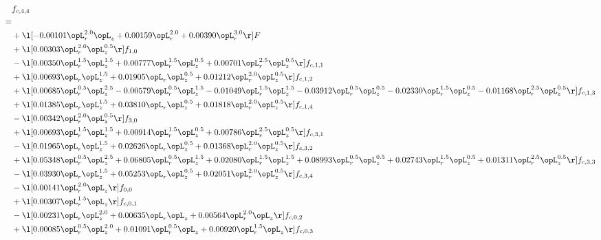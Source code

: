 \begin{alignat}{2} 
\label{eq:f_44_1} 
& f_{c,4,4} \nonumber \\ 
 = \\ 
& + \l[  -0.00101 \opL_r^{2.0} \opL_z +  0.00159 \opL_r^{2.0} +  0.00390 \opL_r^{3.0}  \r] F \nonumber \\ 
& + \l[  0.00303 \opL_r^{2.0} \opL_z^{0.5}  \r] f_{1,0} \nonumber \\ 
& - \l[  0.00350 \opL_r^{1.5} \opL_z^{1.5} +  0.00777 \opL_r^{1.5} \opL_z^{0.5} +  0.00701 \opL_r^{2.5} \opL_z^{0.5}  \r] f_{c,1,1} \nonumber \\ 
& + \l[  0.00693 \opL_r \opL_z^{1.5} +  0.01905 \opL_r \opL_z^{0.5} +  0.01212 \opL_r^{2.0} \opL_z^{0.5}  \r] f_{c,1,2} \nonumber \\ 
& + \l[  0.00685 \opL_r^{0.5} \opL_z^{2.5}   -0.00579 \opL_r^{0.5} \opL_z^{1.5}   -0.01049 \opL_r^{1.5} \opL_z^{1.5}   -0.03912 \opL_r^{0.5} \opL_z^{0.5}   -0.02330 \opL_r^{1.5} \opL_z^{0.5}   -0.01168 \opL_r^{2.5} \opL_z^{0.5}  \r] f_{c,1,3} \nonumber \\ 
& + \l[  0.01385 \opL_r \opL_z^{1.5} +  0.03810 \opL_r \opL_z^{0.5} +  0.01818 \opL_r^{2.0} \opL_z^{0.5}  \r] f_{c,1,4} \nonumber \\ 
& - \l[  0.00342 \opL_r^{2.0} \opL_z^{0.5}  \r] f_{3,0} \nonumber \\ 
& + \l[  0.00693 \opL_r^{1.5} \opL_z^{1.5} +  0.00914 \opL_r^{1.5} \opL_z^{0.5} +  0.00786 \opL_r^{2.5} \opL_z^{0.5}  \r] f_{c,3,1} \nonumber \\ 
& - \l[  0.01965 \opL_r \opL_z^{1.5} +  0.02626 \opL_r \opL_z^{0.5} +  0.01368 \opL_r^{2.0} \opL_z^{0.5}  \r] f_{c,3,2} \nonumber \\ 
& + \l[  0.05348 \opL_r^{0.5} \opL_z^{2.5} +  0.06805 \opL_r^{0.5} \opL_z^{1.5} +  0.02080 \opL_r^{1.5} \opL_z^{1.5} +  0.08993 \opL_r^{0.5} \opL_z^{0.5} +  0.02743 \opL_r^{1.5} \opL_z^{0.5} +  0.01311 \opL_r^{2.5} \opL_z^{0.5}  \r] f_{c,3,3} \nonumber \\ 
& - \l[  0.03930 \opL_r \opL_z^{1.5} +  0.05253 \opL_r \opL_z^{0.5} +  0.02051 \opL_r^{2.0} \opL_z^{0.5}  \r] f_{c,3,4} \nonumber \\ 
& - \l[  0.00141 \opL_r^{2.0} \opL_z  \r] f_{0,0} \nonumber \\ 
& + \l[  0.00307 \opL_r^{1.5} \opL_z  \r] f_{c,0,1} \nonumber \\ 
& - \l[  0.00231 \opL_r \opL_z^{2.0} +  0.00635 \opL_r \opL_z +  0.00564 \opL_r^{2.0} \opL_z  \r] f_{c,0,2} \nonumber \\ 
& + \l[  0.00085 \opL_r^{0.5} \opL_z^{2.0} +  0.01091 \opL_r^{0.5} \opL_z +  0.00920 \opL_r^{1.5} \opL_z  \r] f_{c,0,3} \nonumber \\ 

\end{alignat}
